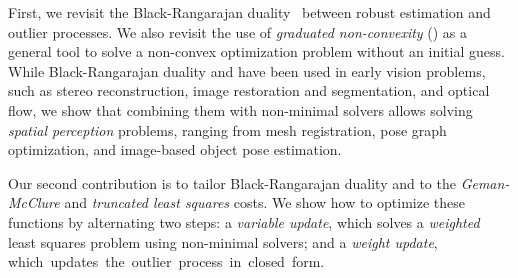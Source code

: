 First, we revisit the Black-Rangarajan duality~\cite{Black96ijcv-unification} between robust estimation and outlier processes.
  We also revisit the use of \emph{graduated non-convexity} (\GNC) as a general tool to solve a non-convex 
  optimization problem without an initial guess.
  While Black-Rangarajan duality and \GNC have been used in early vision problems, such as stereo reconstruction, 
  image restoration and segmentation, and optical flow, 
 we show that combining them with non-minimal solvers allows solving \emph{spatial perception} problems, ranging from 
 mesh registration, pose graph optimization, and image-based object pose estimation.

Our second contribution is to
tailor Black-Rangarajan duality and \GNC to the 
 \textit{Geman-McClure} and \textit{truncated least squares} costs.
We show how to optimize these functions  by alternating two steps: 
a \emph{variable update}, which solves a \emph{weighted} least squares problem using non-minimal solvers; 
 and a \emph{weight update}, \mbox{which updates the outlier process in closed~form.} 

